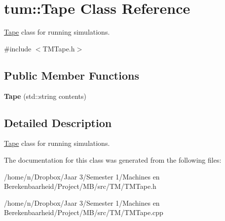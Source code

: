 \hypertarget{classtum_1_1_tape}{\section{tum\-:\-:\-Tape \-Class \-Reference}
\label{classtum_1_1_tape}
}


\hyperlink{classtum_1_1_tape}{\-Tape} class for running simulations.  




{\ttfamily \#include $<$\-T\-M\-Tape.\-h$>$}

\subsection*{\-Public \-Member \-Functions}
\begin{DoxyCompactItemize}
\item 
\hypertarget{classtum_1_1_tape_abe030822746a735d81d1a6e5526a6544}{{\bfseries \-Tape} (std\-::string contents)}\label{classtum_1_1_tape_abe030822746a735d81d1a6e5526a6544}

\end{DoxyCompactItemize}


\subsection{\-Detailed \-Description}
\hyperlink{classtum_1_1_tape}{\-Tape} class for running simulations. 

\-The documentation for this class was generated from the following files\-:\begin{DoxyCompactItemize}
\item 
/home/n/\-Dropbox/\-Jaar 3/\-Semester 1/\-Machines en Berekenbaarheid/\-Project/\-M\-B/src/\-T\-M/\-T\-M\-Tape.\-h\item 
/home/n/\-Dropbox/\-Jaar 3/\-Semester 1/\-Machines en Berekenbaarheid/\-Project/\-M\-B/src/\-T\-M/\-T\-M\-Tape.\-cpp\end{DoxyCompactItemize}
